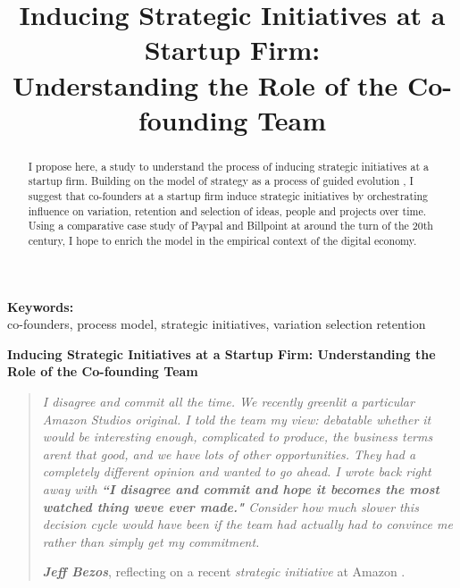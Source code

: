 \documentclass[12pt,letterpaper]{article}
\begin{document}
\title{Inducing Strategic Initiatives at a Startup Firm:\\Understanding the Role of the Co-founding Team}
\date{}
\maketitle

\begin{abstract} 
\normalsize I propose here, a study to understand the process of inducing strategic initiatives at a startup firm. Building on the model of strategy as a process of guided evolution \citep{Lovas2000}, I suggest that co-founders at a startup firm induce strategic initiatives by orchestrating influence on variation, retention and selection of ideas, people and projects over time. Using a comparative case study of Paypal and Billpoint at around the turn of the 20th century, I hope to enrich the \cite{Lovas2000} model in the empirical context of the digital economy.
\end{abstract}


{\textbf{Keywords:} \\\indent co-founders, process model, strategic initiatives, variation selection retention}

\newpage
\pagestyle{fancy}
\fancyhf{}
\rhead{\thepage}

\begin{center}
\textbf{Inducing Strategic Initiatives at a Startup Firm: Understanding the Role of the Co-founding Team}\vspace{1cm}
\end{center}

\begin{quotation}
\textit{I disagree and commit all the time. We recently greenlit a particular Amazon Studios original. I told the team my view: debatable whether it would be interesting enough, complicated to produce, the business terms aren\textquotesingle t that good, and we have lots of other opportunities. They had a completely different opinion and wanted to go ahead. I wrote back right away with \textbf{``I disagree and commit and hope it becomes the most watched thing we\textquotesingle ve ever made."} Consider how much slower this decision cycle would have been if the team had actually had to convince me rather than simply get my commitment.}\par
\null\hfill \textbf{\textit{Jeff Bezos}}, reflecting on a recent \textit{strategic initiative} at Amazon \citep{Bezos2016}.
\end{quotation}
\end{document}
